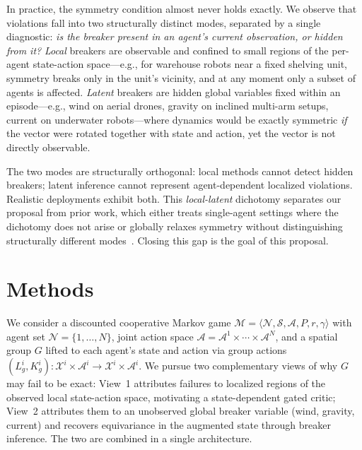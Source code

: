 \documentclass[11pt]{article}
\begin{document}
In practice, the symmetry condition  almost never holds exactly. We observe that violations fall into two structurally distinct modes, separated by a single diagnostic: \emph{is the breaker present in an agent's current observation, or hidden from it?} \emph{Local} breakers are observable and confined to small regions of the per-agent state-action space—e.g., for warehouse robots near a fixed shelving unit, symmetry breaks only in the unit's vicinity, and at any moment only a subset of agents is affected. \emph{Latent} breakers are hidden global variables fixed within an episode—e.g., wind on aerial drones, gravity on inclined multi-arm setups, current on underwater robots—where dynamics would be exactly symmetric \emph{if} the vector were rotated together with state and action, yet the vector is not directly observable.

The two modes are structurally orthogonal: local methods cannot detect hidden breakers; latent inference cannot represent agent-dependent localized violations. Realistic deployments exhibit both. This \emph{local-latent} dichotomy separates our proposal from prior work, which either treats single-agent settings where the dichotomy does not arise or globally relaxes symmetry without distinguishing structurally different modes~\citep{finzi2021rpp,wang2022approx,romero2022partial,vanderouderaa2022relaxing,hofgard2024relaxed,park2025approximate}. Closing this gap is the goal of this proposal.

\section{Methods}
We consider a discounted cooperative Markov game $\mathcal{M} = \langle \mathcal{N}, \mathcal{S}, \mathcal{A}, P, r, \gamma\rangle$ with agent set $\mathcal{N} = \{1, \dots, N\}$, joint action space $\mathcal{A} = \mathcal{A}^1 \times \cdots \times \mathcal{A}^N$, and a spatial group $G$ lifted to each agent's state and action via group actions $(L_g^i, K_g^i)\colon \mathcal{X}^i \times \mathcal{A}^i \to \mathcal{X}^i \times \mathcal{A}^i$. We pursue two complementary views of why $G$ may fail to be exact: View~1 attributes failures to localized regions of the observed local state-action space, motivating a state-dependent gated critic; View~2 attributes them to an unobserved global breaker variable (wind, gravity, current) and recovers equivariance in the augmented state through breaker inference. The two are combined in a single architecture.
\end{document}
